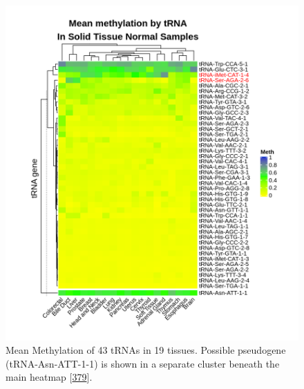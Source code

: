 \documentclass[
]{book}
\begin{document}
\begin{figure}

{\centering \includegraphics[width=0.9\linewidth]{./figs/meanBetasByTissueTNMpseudoSplitHeatmap} 

}

\caption{Mean Methylation of 43 tRNAs in 19 tissues. Possible pseudogene (tRNA-Asn-ATT-1-1) is shown in a separate cluster beneath the main heatmap {[}\protect\hyperlink{ref-Gu2016}{379}{]}.}\label{fig:meanBetasByTissueTNMHeatmap}
\end{figure}
\end{document}
